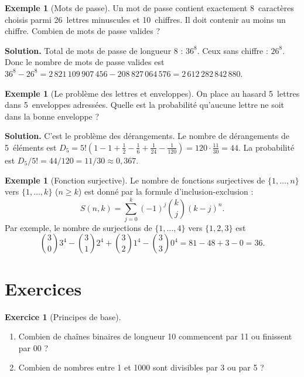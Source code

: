 \documentclass[12pt,a4paper,openany]{book}
\theoremstyle{definition}
\newtheorem{exemple}[definition]{Exemple}
\newtheorem{exercice}{Exercice}[chapter]
\theoremstyle{plain}
\theoremstyle{remark}
\begin{document}
\begin{exemple}[Mots de passe]\label{ex:mdp}
Un mot de passe contient exactement 8~caractères choisis parmi 26~lettres
minuscules et 10~chiffres. Il doit contenir au moins un chiffre. Combien de
mots de passe valides ?

\textbf{Solution.} Total de mots de passe de longueur 8 : $36^8$. Ceux sans
chiffre : $26^8$. Donc le nombre de mots de passe valides est
$36^8 - 26^8 = 2\,821\,109\,907\,456 - 208\,827\,064\,576 = 2\,612\,282\,842\,880$.
\end{exemple}

\begin{exemple}[Le problème des lettres et enveloppes]\label{ex:lettres-enveloppes}
On place au hasard 5~lettres dans 5~enveloppes adressées. Quelle est la
probabilité qu'aucune lettre ne soit dans la bonne enveloppe ?

\textbf{Solution.} C'est le problème des dérangements. Le nombre de
dérangements de 5~éléments est
$D_5 = 5!\left(1 - 1 + \frac{1}{2} - \frac{1}{6} + \frac{1}{24} - \frac{1}{120}\right) = 120 \cdot \frac{11}{30} = 44$.
La probabilité est $D_5/5! = 44/120 = 11/30 \approx 0{,}367$.
\end{exemple}

\begin{exemple}[Fonction surjective]\label{ex:surjection-comptage}
Le nombre de fonctions surjectives de $\{1,\ldots,n\}$ vers $\{1,\ldots,k\}$
($n \geq k$) est donné par la formule d'inclusion-exclusion :
\[
  S(n,k) = \sum_{j=0}^{k}(-1)^j \binom{k}{j}(k-j)^n.
\]
Par exemple, le nombre de surjections de $\{1,\ldots,4\}$ vers $\{1,2,3\}$ est
\[
  \binom{3}{0}3^4 - \binom{3}{1}2^4 + \binom{3}{2}1^4 - \binom{3}{3}0^4
  = 81 - 48 + 3 - 0 = 36.
\]
\end{exemple}

\section{Exercices}\label{sec:exo-ch4}

\begin{exercice}[Principes de base]\label{exo:principes}
\begin{enumerate}
  \item Combien de chaînes binaires de longueur 10 commencent par 11 ou
    finissent par 00 ?
  \item Combien de nombres entre 1 et 1000 sont divisibles par 3 ou par 5 ?
\end{enumerate}
\end{exercice}
\end{document}
